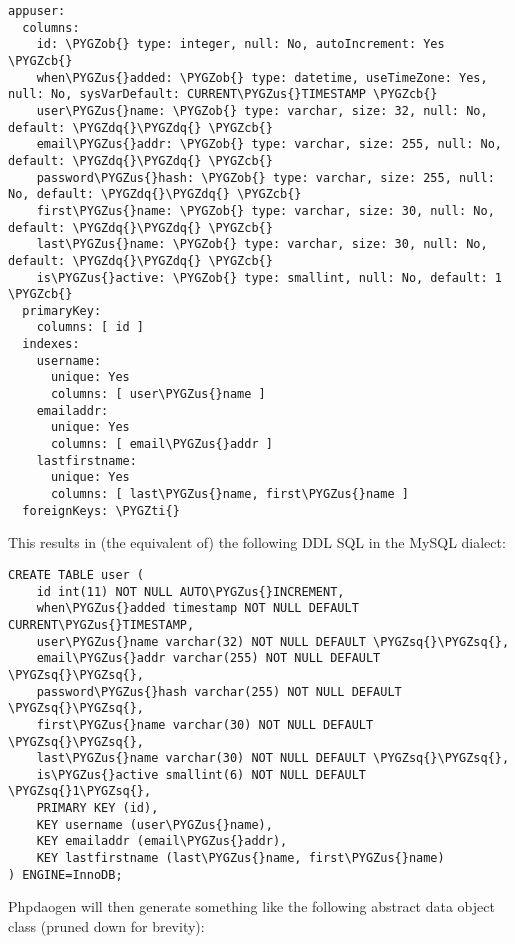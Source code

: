 \documentclass[letterpaper,10pt,english]{sphinxmanual}
\def\PYGZus{\char`\_}
\def\PYGZob{\char`\{}
\def\PYGZcb{\char`\}}
\def\PYGZsq{\char`\'}
\def\PYGZdq{\char`\"}
\def\PYGZti{\char`\~}
\renewcommand\PYGZsq{\textquotesingle}
\begin{document}
\begin{Verbatim}[commandchars=\\\{\}]
appuser:
  columns:
    id: \PYGZob{} type: integer, null: No, autoIncrement: Yes \PYGZcb{}
    when\PYGZus{}added: \PYGZob{} type: datetime, useTimeZone: Yes, null: No, sysVarDefault: CURRENT\PYGZus{}TIMESTAMP \PYGZcb{}
    user\PYGZus{}name: \PYGZob{} type: varchar, size: 32, null: No, default: \PYGZdq{}\PYGZdq{} \PYGZcb{}
    email\PYGZus{}addr: \PYGZob{} type: varchar, size: 255, null: No, default: \PYGZdq{}\PYGZdq{} \PYGZcb{}
    password\PYGZus{}hash: \PYGZob{} type: varchar, size: 255, null: No, default: \PYGZdq{}\PYGZdq{} \PYGZcb{}
    first\PYGZus{}name: \PYGZob{} type: varchar, size: 30, null: No, default: \PYGZdq{}\PYGZdq{} \PYGZcb{}
    last\PYGZus{}name: \PYGZob{} type: varchar, size: 30, null: No, default: \PYGZdq{}\PYGZdq{} \PYGZcb{}
    is\PYGZus{}active: \PYGZob{} type: smallint, null: No, default: 1 \PYGZcb{}
  primaryKey:
    columns: [ id ]
  indexes:
    username:
      unique: Yes
      columns: [ user\PYGZus{}name ]
    emailaddr:
      unique: Yes
      columns: [ email\PYGZus{}addr ]
    lastfirstname:
      unique: Yes
      columns: [ last\PYGZus{}name, first\PYGZus{}name ]
  foreignKeys: \PYGZti{}
\end{Verbatim}

This results in (the equivalent of) the following DDL SQL in the MySQL dialect:

\begin{Verbatim}[commandchars=\\\{\}]
CREATE TABLE user (
    id int(11) NOT NULL AUTO\PYGZus{}INCREMENT,
    when\PYGZus{}added timestamp NOT NULL DEFAULT CURRENT\PYGZus{}TIMESTAMP,
    user\PYGZus{}name varchar(32) NOT NULL DEFAULT \PYGZsq{}\PYGZsq{},
    email\PYGZus{}addr varchar(255) NOT NULL DEFAULT \PYGZsq{}\PYGZsq{},
    password\PYGZus{}hash varchar(255) NOT NULL DEFAULT \PYGZsq{}\PYGZsq{},
    first\PYGZus{}name varchar(30) NOT NULL DEFAULT \PYGZsq{}\PYGZsq{},
    last\PYGZus{}name varchar(30) NOT NULL DEFAULT \PYGZsq{}\PYGZsq{},
    is\PYGZus{}active smallint(6) NOT NULL DEFAULT \PYGZsq{}1\PYGZsq{},
    PRIMARY KEY (id),
    KEY username (user\PYGZus{}name),
    KEY emailaddr (email\PYGZus{}addr),
    KEY lastfirstname (last\PYGZus{}name, first\PYGZus{}name)
) ENGINE=InnoDB;
\end{Verbatim}

Phpdaogen will then generate something like the following abstract data object class (pruned down
for brevity):
\end{document}
